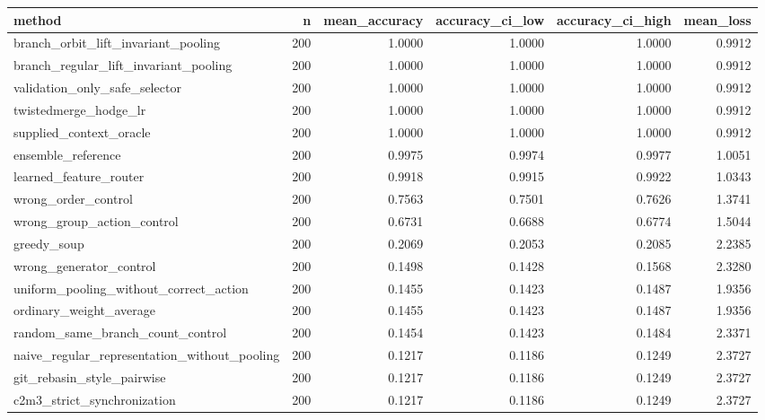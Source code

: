 \begin{tabular}{lrrrrr}
\toprule
method & n & mean_accuracy & accuracy_ci_low & accuracy_ci_high & mean_loss \\
\midrule
branch_orbit_lift_invariant_pooling & 200 & 1.0000 & 1.0000 & 1.0000 & 0.9912 \\
branch_regular_lift_invariant_pooling & 200 & 1.0000 & 1.0000 & 1.0000 & 0.9912 \\
validation_only_safe_selector & 200 & 1.0000 & 1.0000 & 1.0000 & 0.9912 \\
twistedmerge_hodge_lr & 200 & 1.0000 & 1.0000 & 1.0000 & 0.9912 \\
supplied_context_oracle & 200 & 1.0000 & 1.0000 & 1.0000 & 0.9912 \\
ensemble_reference & 200 & 0.9975 & 0.9974 & 0.9977 & 1.0051 \\
learned_feature_router & 200 & 0.9918 & 0.9915 & 0.9922 & 1.0343 \\
wrong_order_control & 200 & 0.7563 & 0.7501 & 0.7626 & 1.3741 \\
wrong_group_action_control & 200 & 0.6731 & 0.6688 & 0.6774 & 1.5044 \\
greedy_soup & 200 & 0.2069 & 0.2053 & 0.2085 & 2.2385 \\
wrong_generator_control & 200 & 0.1498 & 0.1428 & 0.1568 & 2.3280 \\
uniform_pooling_without_correct_action & 200 & 0.1455 & 0.1423 & 0.1487 & 1.9356 \\
ordinary_weight_average & 200 & 0.1455 & 0.1423 & 0.1487 & 1.9356 \\
random_same_branch_count_control & 200 & 0.1454 & 0.1423 & 0.1484 & 2.3371 \\
naive_regular_representation_without_pooling & 200 & 0.1217 & 0.1186 & 0.1249 & 2.3727 \\
git_rebasin_style_pairwise & 200 & 0.1217 & 0.1186 & 0.1249 & 2.3727 \\
c2m3_strict_synchronization & 200 & 0.1217 & 0.1186 & 0.1249 & 2.3727 \\
\bottomrule
\end{tabular}
